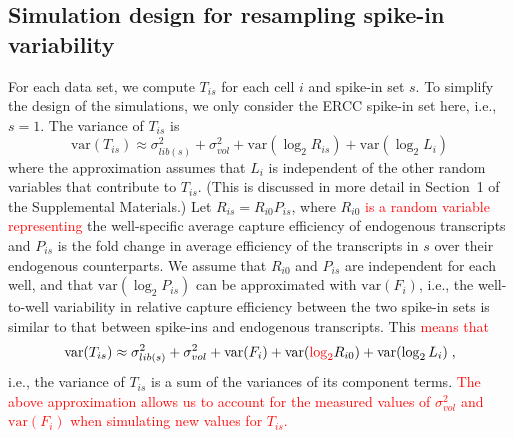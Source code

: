 \documentclass{article}
\newcommand{\suppsecmath}{1}
\newcommand{\revised}[1]{\textcolor{red}{#1}}
\newcommand\variance{\mbox{var}}
\begin{document}
\subsection*{Simulation design for resampling spike-in variability}
For each data set, we compute $T_{is}$ for each cell $i$ and spike-in set $s$.
To simplify the design of the simulations, we only consider the ERCC spike-in set here, i.e., $s=1$.
The variance of $T_{is}$ is
\[
    \variance(T_{is}) \approx \sigma^2_{lib(s)} + \sigma^2_{vol} + \variance(\log_2 R_{is}) + \variance(\log_2 L_i)
\]
where the approximation assumes that $L_i$ is independent of the other random variables that contribute to $T_{is}$.
(This is discussed in more detail in Section~\suppsecmath{} of the Supplemental Materials.)
Let $R_{is} = R_{i0}P_{is}$, where $R_{i0}$ \revised{is a random variable representing} the well-specific average capture efficiency of endogenous transcripts and $P_{is}$ is the fold change in average efficiency of the transcripts in $s$ over their endogenous counterparts.
We assume that $R_{i0}$ and $P_{is}$ are independent for each well, and that $\variance(\log_2 P_{is})$ can be approximated with $\variance(F_i)$,
i.e., the well-to-well variability in relative capture efficiency between the two spike-in sets is similar to that between spike-ins and endogenous transcripts.
This \revised{means that}
\[
    \variance(T_{is}) \approx \sigma^2_{lib(s)} + \sigma^2_{vol} + \variance(F_i) + \variance(\revised{\log_2} R_{i0}) + \variance(\log_2 L_i) \;,
\]
i.e., the variance of $T_{is}$ is a sum of the variances of its component terms.
\revised{The above approximation allows us to account for the measured values of $ \sigma^2_{vol}$ and $\variance(F_i)$ when simulating new values for $T_{is}$.}

\end{document}
